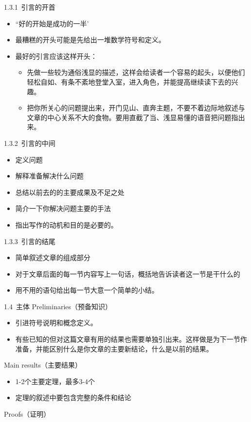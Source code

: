 \documentclass[13pt,fontset=mac]{ctexbeamer}
\begin{document}
\begin{frame}{1.3.1~引言的开首}
		\begin{itemize}
		\item ``好的开始是成功的一半'

		\item 最糟糕的开头可能是先给出一堆数学符号和定义。

		\item  最好的引言应该这样开头：
	\begin{itemize}
		\item 先做一些较为通俗浅显的描述，这样会给读者一个容易的起头，以便他们轻松自如、有条不紊地登堂入室，进入角色，并能提高继续读下去的兴趣。
		\item  把你所关心的问题提出来，开门见山、直奔主题，不要不着边际地叙述与文章的中心关系不大的食物。要用直截了当、浅显易懂的语音把问题指出来。
	\end{itemize}
	\end{itemize}
\end{frame}


\begin{frame}{1.3.2~引言的中间}
	\begin{itemize}
		
		\item 定义问题
		
		\item 解释准备解决什么问题
		\item 总结以前去的的主要成果及不足之处
		\item 简介一下你解决问题主要的手法
		\item 指出写作的动机和目的是必要的。
	\end{itemize}
\end{frame}

\begin{frame}{1.3.3~引言的结尾}
	\begin{itemize}
		
		\item 简单叙述文章的组成部分
		
		\item 对于文章后面的每一节内容写上一句话，概括地告诉读者这一节是干什么的
		\item 用不用的语句给出每一节大意一个简单的小结。
	\end{itemize}
\end{frame}


\begin{frame}{1.4~主体}
	Preliminaries（预备知识）
	\begin{itemize}
		\item  引进符号说明和概念定义。
		\item  有些已知的但对这篇文章有用的结果也需要单独引出来。这样做是为下一节作准备，并能区别什么是你文章的主要新结论，什么是以前的结果。
	\end{itemize}
	Main results（主要结果）
		\begin{itemize}
		\item  1-2个主要定理，最多3-4个
		\item 定理的叙述中要包含完整的条件和结论
	\end{itemize}

Proofs（证明）
\end{frame}
\end{document}
